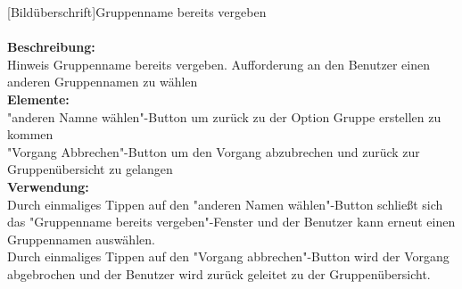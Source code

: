 [Bildüberschrift]Gruppenname bereits vergeben\\ \\
\textbf{Beschreibung:}\\
Hinweis Gruppenname bereits vergeben. Aufforderung an den Benutzer einen anderen Gruppennamen zu wählen\\
\textbf{Elemente:}\\
"anderen Namne wählen"-Button um zurück zu der Option Gruppe erstellen zu kommen\\
"Vorgang Abbrechen"-Button um den Vorgang abzubrechen und zurück zur Gruppenübersicht zu gelangen\\
\textbf{Verwendung:}\\
Durch einmaliges Tippen auf den "anderen Namen wählen"-Button schließt sich das "Gruppenname bereits vergeben"-Fenster und der Benutzer kann erneut einen Gruppennamen auswählen.\\
Durch einmaliges Tippen auf den "Vorgang abbrechen"-Button wird der Vorgang abgebrochen und der Benutzer wird zurück geleitet zu der Gruppenübersicht.\\ \\

